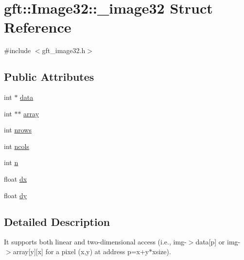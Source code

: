\hypertarget{structgft_1_1Image32_1_1__image32}{\section{gft\-:\-:Image32\-:\-:\-\_\-image32 Struct Reference}
\label{structgft_1_1Image32_1_1__image32}
}


{\ttfamily \#include $<$gft\-\_\-image32.\-h$>$}

\subsection*{Public Attributes}
\begin{DoxyCompactItemize}
\item 
int $\ast$ \hyperlink{structgft_1_1Image32_1_1__image32_ab054124c321db9d0fd1f4aa353d0fd46}{data}
\item 
int $\ast$$\ast$ \hyperlink{structgft_1_1Image32_1_1__image32_a2a657a1032f09c6f75c9fcab33959cf9}{array}
\item 
int \hyperlink{structgft_1_1Image32_1_1__image32_aa912fd17d6133ee3d1fcf668865e4677}{nrows}
\item 
int \hyperlink{structgft_1_1Image32_1_1__image32_a6435c546474bb74eb8476b5683815b84}{ncols}
\item 
int \hyperlink{structgft_1_1Image32_1_1__image32_a3961d7deb5c522b9c1db5f08c8fe732c}{n}
\item 
float \hyperlink{structgft_1_1Image32_1_1__image32_a361e6d86f1cc6efcc8961d4e46fc51c8}{dx}
\item 
float \hyperlink{structgft_1_1Image32_1_1__image32_a6243d3d012d94c8c39ddddd6e21b592f}{dy}
\end{DoxyCompactItemize}


\subsection{Detailed Description}
It supports both linear and two-\/dimensional access (i.\-e., img-\/$>$data\mbox{[}p\mbox{]} or img-\/$>$array\mbox{[}y\mbox{]}\mbox{[}x\mbox{]} for a pixel (x,y) at address p=x+y$\ast$xsize). 

